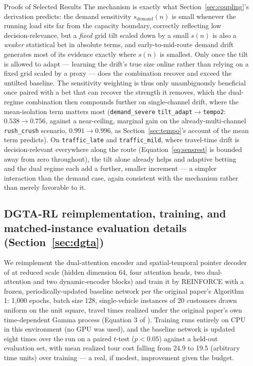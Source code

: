 \documentclass[trsc,dblanonrev]{informs4}
\begin{document}
\begin{APPENDIX}{Proofs of Selected Results}
The mechanism is exactly what Section~\ref{sec:coupling}'s derivation
predicts: the demand sensitivity $s_{\mathrm{demand}}(n)$ is small
whenever the running load sits far from the capacity boundary,
correctly reflecting low decision-relevance, but a \emph{fixed} grid
tilt scaled down by a small $s(n)$ is also a \emph{weaker} statistical
bet in absolute terms, and early-to-mid-route demand drift generates
most of its evidence exactly where $s(n)$ is smallest. Only once the
tilt is allowed to adapt --- learning the drift's true size online
rather than relying on a fixed grid scaled by a proxy --- does the
combination recover and exceed the untilted baseline. The sensitivity
weighting is thus only unambiguously beneficial once paired with a bet
that can recover the strength it removes, which the dual-regime
combination then compounds further on single-channel drift, where the
mean-isolation term matters most (\texttt{demand\_severe}
\texttt{tilt\_adapt}$\to$\texttt{tempo2}: $0.538 \to 0.756$, against a
near-ceiling, marginal gain on the already-multi-channel
\texttt{rush\_crush} scenario, $0.991 \to 0.996$, as
Section~\ref{sec:tempo}'s account of the mean term predicts). On
\texttt{traffic\_late} and \texttt{traffic\_mild}, where travel-time
drift is decision-relevant everywhere along the route
(Equation~\eqref{eq:sensrest} is bounded away from zero throughout), the
tilt alone already helps and adaptive betting and the dual regime each
add a further, smaller increment --- a simpler interaction than the
demand case, again consistent with the mechanism rather than merely
favorable to it.

\subsection{DGTA-RL reimplementation, training, and matched-instance evaluation details (Section~\ref{sec:dgta})}

We reimplement the dual-attention encoder and spatial-temporal pointer
decoder of \citet{chen2025dgta} at reduced scale (hidden dimension 64,
four attention heads, two dual-attention and two dynamic-encoder
blocks) and train it by REINFORCE with a frozen, periodically-updated
baseline network per the original paper's Algorithm 1: 1{,}000 epochs,
batch size 128, single-vehicle instances of 20 customers drawn uniform
on the unit square, travel times realized under the original paper's
own time-dependent Gamma process (Equation 3 of \citealp{chen2025dgta}).
Training runs entirely on CPU in this environment (no GPU was used),
and the baseline network is updated eight times over the run on a
paired $t$-test ($p<0.05$) against a held-out evaluation set, with
mean realized tour cost falling from 24.9 to 19.5 (arbitrary time
units) over training --- a real, if modest, improvement given the
budget.


\end{APPENDIX}
\end{document}
